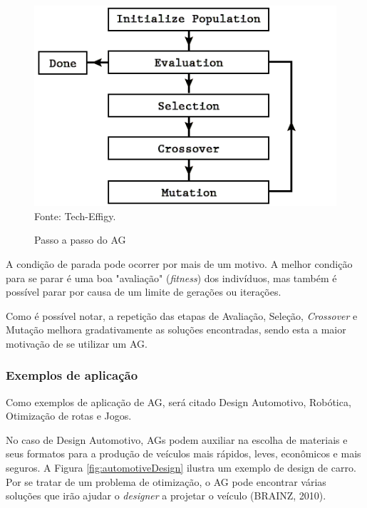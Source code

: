 \documentclass[12pt,a4paper]{article}
\newcommand{\source}[1]{\small Fonte: {#1}}
\begin{document}
	\begin{figure}[ht!]
		\centering
		\caption{Passo a passo do AG}
		\includegraphics[scale=0.7]{GeneticAlgorithmFlow.png}\\
		\vspace{0.5mm}
		\source{Tech-Effigy.}
		\label{fig:gaflow}
	\end{figure}
	
	A condição de parada pode ocorrer por mais de um motivo.
	A melhor condição para se parar é uma boa "avaliação"{} (\textit{fitness}) dos indivíduos,
	mas também é possível parar por causa de um limite de gerações ou iterações.
	
	Como é possível notar,
	a repetição das etapas de Avaliação, Seleção, \textit{Crossover} e Mutação melhora gradativamente as soluções encontradas,
	sendo esta a maior motivação de se utilizar um AG.	
	
	\FloatBarrier
	\subsubsection{Exemplos de aplicação}
	Como exemplos de aplicação de AG,
	será citado
	Design Automotivo, Robótica, Otimização de rotas e Jogos.
	
	No caso de Design Automotivo,
	AGs podem auxiliar na escolha de materiais e seus formatos para a produção de veículos mais rápidos, leves, econômicos e mais seguros.
	A Figura \ref{fig:automotiveDesign} ilustra um exemplo de design de carro.
	Por se tratar de um problema de otimização,
	o AG pode encontrar várias soluções que irão ajudar o \textit{designer} a projetar o veículo
	(BRAINZ, 2010).
	
\end{document}
